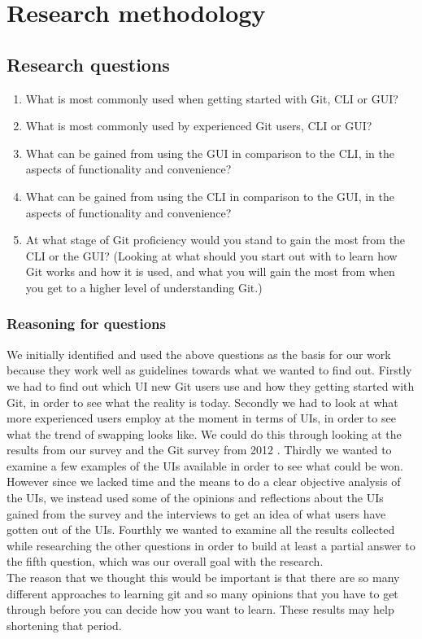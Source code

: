 \documentclass[a4paper,oneside]{bth} %
\begin{document}
		\chapter{Research methodology}
			\section{Research questions}
			\begin{enumerate}
				\item What is most commonly used when getting started with Git, CLI or GUI?
				\item What is most commonly used by experienced Git users, CLI or GUI?
				\item What can be gained from using the GUI in comparison to the CLI, in the aspects of functionality and convenience?
				\item What can be gained from using the CLI in comparison to the GUI, in the aspects of functionality and convenience?
				\item At what stage of Git proficiency would you stand to gain the most from the CLI or the GUI? (Looking at what should you start out with to learn how Git works and how it is used, and what you will gain the most from when you get to a higher level of understanding Git.)
			\end{enumerate}
				\subsection{Reasoning for questions}
				We initially identified and used the above questions as the basis for our work because they work well as guidelines towards what we wanted to find out. Firstly we had to find out which UI new Git users use and how they getting started with Git, in order to see what the reality is today. Secondly we had to look at what more experienced users employ at the moment in terms of UIs, in order to see what the trend of swapping looks like. We could do this through looking at the results from our survey and the Git survey from 2012 \cite{GitUserSurvey}. Thirdly we wanted to examine a few examples of the UIs available in order to see what could be won. However since we lacked time and the means to do a clear objective analysis of the UIs, we instead used some of the opinions and reflections about the UIs gained from the survey and the interviews to get an idea of what users have gotten out of the UIs. Fourthly we wanted to examine all the results collected while researching the other questions in order to build at least a partial answer to the fifth question, which was our overall goal with the research.\\
				The reason that we thought this would be important is that there are so many different approaches to learning git and so many opinions that you have to get through before you can decide how you want to learn. These results may help shortening that period.
\end{document}
